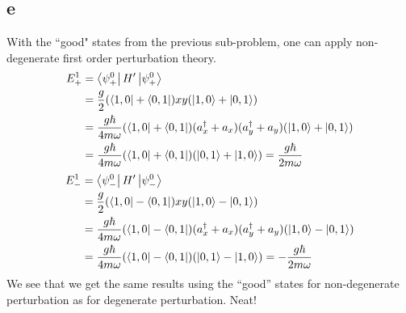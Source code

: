 \documentclass[11pt]{amsart}
\begin{document}
\subsection*{e}
With the ``good" states from the previous sub-problem, one can apply non-degenerate first order perturbation theory.
\begin{align*}
E_+^1 	&= \bra{\psi_+^0}H'\ket{\psi_+^0} \\
		&= \frac{g}{2}(\bra{1,0} + \bra{0,1})xy(\ket{1,0} + \ket{0,1}) \\
		&= \frac{g\hbar}{4m\omega}(\bra{1,0} + \bra{0,1})(a_x^{\dagger}+a_x)(a_y^{\dagger}+a_y)(\ket{1,0} + \ket{0,1}) \\
		&= \frac{g\hbar}{4m\omega}(\bra{1,0} + \bra{0,1})(\ket{0,1} + \ket{1,0}) = \frac{g\hbar}{2m\omega}
\end{align*}
\begin{align*}
E_-^1 	&= \bra{\psi_-^0}H'\ket{\psi_-^0} \\
		&= \frac{g}{2}(\bra{1,0} - \bra{0,1})xy(\ket{1,0} - \ket{0,1}) \\
		&= \frac{g\hbar}{4m\omega}(\bra{1,0} - \bra{0,1})(a_x^{\dagger}+a_x)(a_y^{\dagger}+a_y)(\ket{1,0} - \ket{0,1}) \\
		&= \frac{g\hbar}{4m\omega}(\bra{1,0} - \bra{0,1})(\ket{0,1} - \ket{1,0}) = -\frac{g\hbar}{2m\omega}
\end{align*}
We see that we get the same results using the ``good'' states for non-degenerate perturbation as for degenerate perturbation. Neat!
\end{document}
